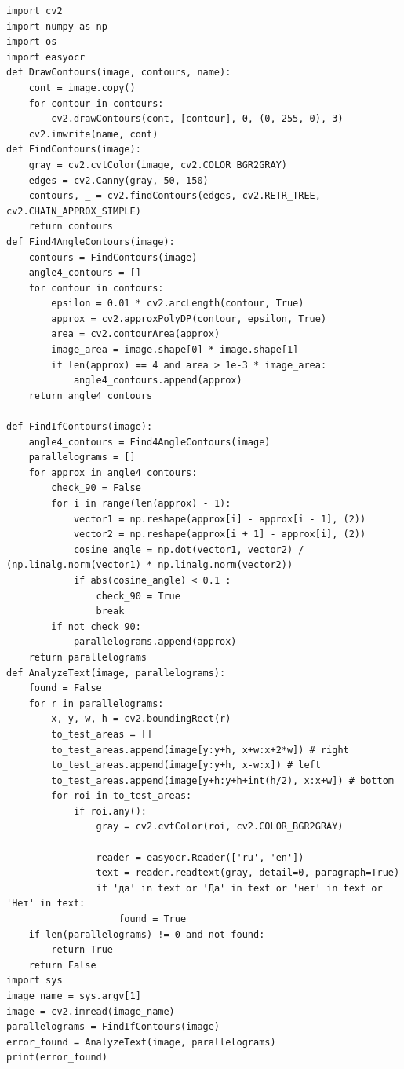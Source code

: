 \documentclass[12pt]{report}
\begin{document}
\begin{lstlisting}[label=lst:lst,caption=Реализация алгоритма решения задачи]
import cv2
import numpy as np
import os
import easyocr
def DrawContours(image, contours, name):
    cont = image.copy()
    for contour in contours:
        cv2.drawContours(cont, [contour], 0, (0, 255, 0), 3)
    cv2.imwrite(name, cont)
def FindContours(image):
    gray = cv2.cvtColor(image, cv2.COLOR_BGR2GRAY)
    edges = cv2.Canny(gray, 50, 150)
    contours, _ = cv2.findContours(edges, cv2.RETR_TREE, cv2.CHAIN_APPROX_SIMPLE)
    return contours
def Find4AngleContours(image):
    contours = FindContours(image)
    angle4_contours = []
    for contour in contours:
        epsilon = 0.01 * cv2.arcLength(contour, True)
        approx = cv2.approxPolyDP(contour, epsilon, True)
        area = cv2.contourArea(approx)
        image_area = image.shape[0] * image.shape[1]
        if len(approx) == 4 and area > 1e-3 * image_area:
            angle4_contours.append(approx)
    return angle4_contours
            
def FindIfContours(image):
    angle4_contours = Find4AngleContours(image)
    parallelograms = []
    for approx in angle4_contours:
        check_90 = False
        for i in range(len(approx) - 1):
            vector1 = np.reshape(approx[i] - approx[i - 1], (2))
            vector2 = np.reshape(approx[i + 1] - approx[i], (2))
            cosine_angle = np.dot(vector1, vector2) / (np.linalg.norm(vector1) * np.linalg.norm(vector2))
            if abs(cosine_angle) < 0.1 :
                check_90 = True
                break
        if not check_90:
            parallelograms.append(approx)
    return parallelograms
def AnalyzeText(image, parallelograms):
    found = False
    for r in parallelograms:
        x, y, w, h = cv2.boundingRect(r)
        to_test_areas = []
        to_test_areas.append(image[y:y+h, x+w:x+2*w]) # right
        to_test_areas.append(image[y:y+h, x-w:x]) # left
        to_test_areas.append(image[y+h:y+h+int(h/2), x:x+w]) # bottom
        for roi in to_test_areas:
            if roi.any():
                gray = cv2.cvtColor(roi, cv2.COLOR_BGR2GRAY)
                
                reader = easyocr.Reader(['ru', 'en'])
                text = reader.readtext(gray, detail=0, paragraph=True)
                if 'да' in text or 'Да' in text or 'нет' in text or 'Нет' in text:
                    found = True
    if len(parallelograms) != 0 and not found:
        return True    
    return False
import sys
image_name = sys.argv[1]
image = cv2.imread(image_name)
parallelograms = FindIfContours(image)
error_found = AnalyzeText(image, parallelograms)
print(error_found)
\end{lstlisting}
\end{document}
